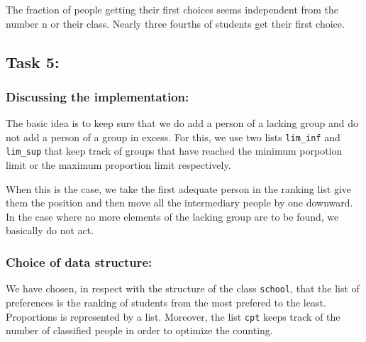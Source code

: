 \documentclass[11pt]{article}
\begin{document}
    The fraction of people getting their first choices seems independent
from the number n or their class. Nearly three fourths of students get
their first choice.

    \hypertarget{task-5}{%
\subsection{Task 5:}\label{task-5}}

    \hypertarget{discussing-the-implementation}{%
\subsubsection{Discussing the
implementation:}\label{discussing-the-implementation}}

The basic idea is to keep sure that we do add a person of a lacking
group and do not add a person of a group in excess. For this, we use two
lists \texttt{lim\_inf} and \texttt{lim\_sup} that keep track of groups
that have reached the minimum porpotion limit or the maximum proportion
limit respectively.

When this is the case, we take the first adequate person in the ranking
list give them the position and then move all the intermediary people by
one downward. In the case where no more elements of the lacking group
are to be found, we basically do not act.

    \hypertarget{choice-of-data-structure}{%
\subsubsection{Choice of data
structure:}\label{choice-of-data-structure}}

We have chosen, in respect with the structure of the class
\texttt{school}, that the list of preferences is the ranking of students
from the most prefered to the least. Proportions is represented by a
list. Moreover, the list \texttt{cpt} keeps track of the number of
classified people in order to optimize the counting.
\end{document}
